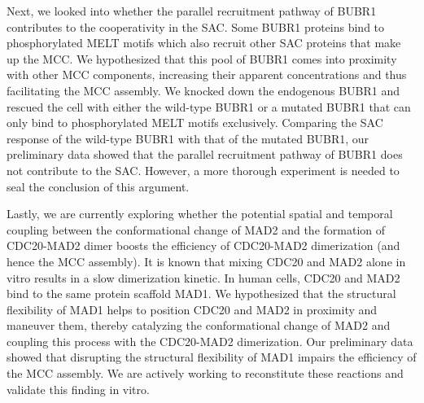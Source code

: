 Next, we looked into whether the parallel recruitment pathway of BUBR1 contributes to the cooperativity in the SAC. Some BUBR1 proteins bind to phosphorylated MELT motifs which also recruit other SAC proteins that make up the MCC. We hypothesized that this pool of BUBR1 comes into proximity with other MCC components, increasing their apparent concentrations and thus facilitating the MCC assembly. We knocked down the endogenous BUBR1 and rescued the cell with either the wild-type BUBR1 or a mutated BUBR1 that can only bind to phosphorylated MELT motifs exclusively. Comparing the SAC response of the wild-type BUBR1 with that of the mutated BUBR1, our preliminary data showed that the parallel recruitment pathway of BUBR1 does not contribute to the SAC. However, a more thorough experiment is needed to seal the conclusion of this argument.

Lastly, we are currently exploring whether the potential spatial and temporal coupling between the conformational change of MAD2 and the formation of CDC20-MAD2 dimer boosts the efficiency of CDC20-MAD2 dimerization (and hence the MCC assembly). It is known that mixing CDC20 and MAD2 alone in vitro results in a slow dimerization kinetic. In human cells, CDC20 and MAD2 bind to the same protein scaffold MAD1. We hypothesized that the structural flexibility of MAD1 helps to position CDC20 and MAD2 in proximity and maneuver them, thereby catalyzing the conformational change of MAD2 and coupling this process with the CDC20-MAD2 dimerization. Our preliminary data showed that disrupting the structural flexibility of MAD1 impairs the efficiency of the MCC assembly. We are actively working to reconstitute these reactions and validate this finding in vitro.

